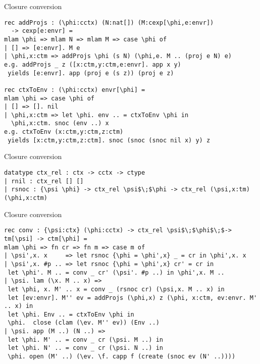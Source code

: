 \documentclass{beamer}
\begin{document}
\begin{frame}[fragile]{Closure conversion}

\begin{lstlisting}
rec addProjs : (\phi:cctx) (N:nat[]) (M:cexp[\phi,e:envr])
  -> cexp[e:envr] =
mlam \phi => mlam N => mlam M => case \phi of
| [] => [e:envr]. M e
| \phi,x:ctm => addProjs \phi (s N) (\phi,e. M .. (proj e N) e)
e.g. addProjs _ z ([x:ctm,y:ctm,e:envr]. app x y)
 yields [e:envr]. app (proj e (s z)) (proj e z)

rec ctxToEnv : (\phi:cctx) envr[\phi] =
mlam \phi => case \phi of
| [] => []. nil
| \phi,x:ctm => let \phi. env .. = ctxToEnv \phi in
  \phi,x:ctm. snoc (env ..) x
e.g. ctxToEnv (x:ctm,y:ctm,z:ctm)
 yields [x:ctm,y:ctm,z:ctm]. snoc (snoc (snoc nil x) y) z

\end{lstlisting}
\end{frame}

\begin{frame}[fragile]{Closure conversion}
\begin{lstlisting}
datatype ctx_rel : ctx -> cctx -> ctype
| rnil : ctx_rel [] []
| rsnoc : {\psi \phi} -> ctx_rel \psi$\;$\phi -> ctx_rel (\psi,x:tm) (\phi,x:ctm)
\end{lstlisting}
\end{frame}
\begin{frame}[fragile]{Closure conversion}
\begin{lstlisting}
rec conv : {\psi:ctx} (\phi:cctx) -> ctx_rel \psi$\;$\phi$\;$-> tm[\psi] -> ctm[\phi] =
mlam \phi => fn cr => fn m => case m of
| \psi',x. x     => let rsnoc {\phi = \phi',x} _ = cr in \phi',x. x
| \psi',x. #p .. => let rsnoc {\phi = \phi',x} cr' = cr in 
 let \phi'. M .. = conv _ cr' (\psi'. #p ..) in \phi',x. M ..
| \psi. lam (\x. M .. x) =>
 let \phi, x. M' .. x = conv _ (rsnoc cr) (\psi,x. M .. x) in
 let [ev:envr]. M'' ev = addProjs (\phi,x) z (\phi, x:ctm, ev:envr. M' .. x) in
 let \phi. Env .. = ctxToEnv \phi in 
 \phi.  close (clam (\ev. M'' ev)) (Env ..)
| \psi. app (M ..) (N ..) =>
 let \phi. M' .. = conv _ cr (\psi. M ..) in
 let \phi. N' .. = conv _ cr (\psi. N ..) in
 \phi. open (M' ..) (\ev. \f. capp f (create (snoc ev (N' ..))))
\end{lstlisting}
\end{frame}
\end{document}

